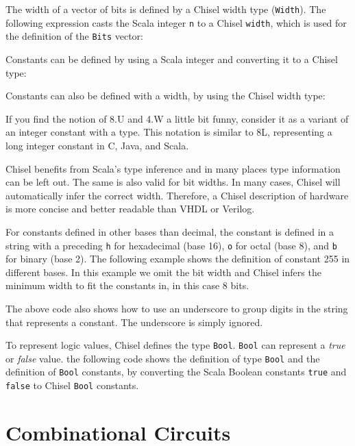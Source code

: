\documentclass[%
    10pt,
    headinclude, footexclude,
    openright, %
    notitlepage,
    cleardoubleempty,
    headsepline,
    pointlessnumbers,
    bibtotoc, idxtotoc,
    ]{scrbook}
\newcommand{\code}[1]{{\small{\texttt{#1}}}}
\begin{document}

\noindent The width of a vector of bits is defined by a Chisel width type (\code{Width}).
The following expression casts the Scala integer \code{n} to a Chisel \code{width},
which is used for the definition of the \code{Bits} vector:


\noindent Constants can be defined by using a Scala integer and converting it to a Chisel type:


\noindent Constants can also be defined with a width, by using the Chisel width type:


\noindent If you find the notion of 8.U and 4.W a little bit funny, consider it as a variant of an integer
constant with a type. This notation is similar to 8L, representing a long integer constant in C, Java, and Scala.

Chisel benefits from Scala's type inference and in many places type information can be left out.
The same is also valid for bit widths. In many cases, Chisel will automatically infer the correct width.
Therefore, a Chisel description of hardware is more concise and better readable than VHDL or
Verilog.

For constants defined in other bases than decimal, the constant is defined in a string with
a preceding \code{h} for hexadecimal (base 16), \code{o} for octal (base 8), and \code{b}
for binary (base 2). The following example shows the definition of constant 255 in different
bases. In this example we omit the bit width and Chisel infers the minimum width to fit
the constants in, in this case 8 bits.


\noindent The above code also shows how to use an underscore to group digits in the
string that represents a constant. The underscore is simply ignored.

To represent logic values, Chisel defines the type \code{Bool}.
\code{Bool} can represent a \emph{true} or \emph{false} value.
the following code shows the definition of type \code{Bool} and the definition of
\code{Bool} constants, by converting the Scala Boolean constants \code{true}
and \code{false} to Chisel \code{Bool} constants.



\section{Combinational Circuits}
\end{document}
